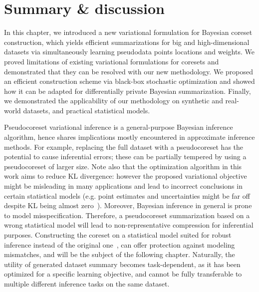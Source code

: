 \section{Summary \& discussion}
In this chapter, we introduced a new variational formulation for Bayesian coreset construction, which yields efficient summarizations for big and high-dimensional datasets via simultaneously learning pseudodata points locations and weights. We proved limitations of existing variational formulations for coresets and demonstrated that they can be resolved with our new methodology. We proposed an efficient construction scheme via black-box stochastic optimization and showed how it can be adapted for differentially private Bayesian summarization. Finally, we demonstrated the applicability of our methodology on synthetic and real-world datasets, and practical statistical models.  


Pseudocoreset variational inference is a general-purpose Bayesian inference
algorithm, hence shares implications mostly encountered in approximate
inference methods. For example, replacing the full dataset with a
pseudocoreset has the potential to cause inferential errors; these can be
partially tempered by using a pseudocoreset of larger size. Note also
that the optimization algorithm in this work aims to reduce 
KL divergence: however the proposed
variational objective might be misleading in many applications and lead to
incorrect conclusions in certain statistical models (e.g. point estimates and
uncertainties might be far off despite KL being almost zero~\citep{huggins20}).
Moreover, Bayesian inference in general is prone to model misspecification.
Therefore, a pseudocoreset summarization based on a wrong statistical model
will lead to non-representative compression for inferential purposes.
Constructing the coreset on a statistical model suited for robust inference
instead of the original one~\citep{miller19, wang17}, can offer protection
against modeling mismatches, and will be the subject of the following chapter. Naturally, the utility of generated dataset
summary becomes task-dependent, as it has been optimized for a specific
learning objective, and cannot be fully transferable to multiple different
inference tasks on the same dataset.


